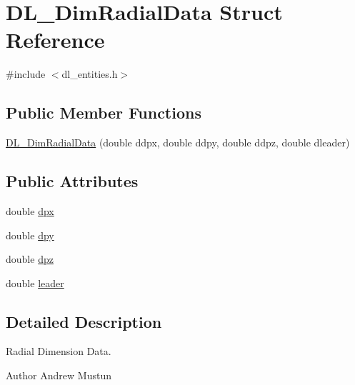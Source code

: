 \hypertarget{structDL__DimRadialData}{\section{D\-L\-\_\-\-Dim\-Radial\-Data Struct Reference}
\label{structDL__DimRadialData}
}


{\ttfamily \#include $<$dl\-\_\-entities.\-h$>$}

\subsection*{Public Member Functions}
\begin{DoxyCompactItemize}
\item 
\hyperlink{structDL__DimRadialData_a3b687592881be08e0703b64030012ab6}{D\-L\-\_\-\-Dim\-Radial\-Data} (double ddpx, double ddpy, double ddpz, double dleader)
\end{DoxyCompactItemize}
\subsection*{Public Attributes}
\begin{DoxyCompactItemize}
\item 
double \hyperlink{structDL__DimRadialData_a8f838fb8c7303b580a2cfc9281f02f4a}{dpx}
\item 
double \hyperlink{structDL__DimRadialData_aa9a7686fc3ba14c386c4480edee8ee03}{dpy}
\item 
double \hyperlink{structDL__DimRadialData_aee0c285529533ff67c2f92953e7a52f2}{dpz}
\item 
double \hyperlink{structDL__DimRadialData_a35c2c6ea123381cd28e4eb2496c6c6cf}{leader}
\end{DoxyCompactItemize}


\subsection{Detailed Description}
Radial Dimension Data.

\begin{DoxyAuthor}{Author}
Andrew Mustun 
\end{DoxyAuthor}


